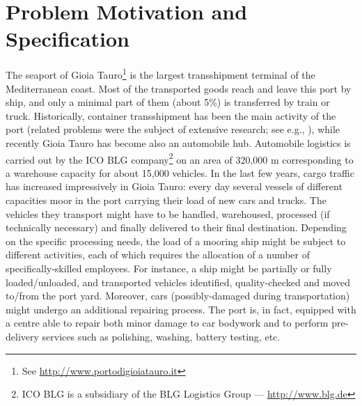 \documentclass{tlp}
\begin{document}
\section{Problem Motivation and Specification}\label{sec:domain}
The seaport of Gioia Tauro\footnote{See \url{http://www.portodigioiatauro.it}}
is the largest
transshipment terminal of the Mediterranean coast.
Most of the transported goods reach and leave this port by ship,
and only a minimal part of them (about 5\%) is transferred by train or truck.
Historically, container transshipment has been the main activity of the port
(related problems were the subject of extensive research; see e.g., ),
while  recently Gioia Tauro has become also an automobile hub.
Automobile logistics is carried out by the ICO BLG company\footnote{ICO BLG is a subsidiary of the BLG Logistics Group --- \url{http://www.blg.de}}
on an area of  320,000 m corresponding to a warehouse capacity for about 15,000 vehicles.
In the last few years, cargo traffic has increased impressively in Gioia Tauro:
every day several vessels of different capacities moor in the port carrying their load of new cars and trucks.
The vehicles they transport might have to be handled, warehoused, processed
(if technically necessary) and finally delivered to their final destination.
Depending on the specific processing needs, the load of a mooring ship might be subject
to different activities,  each of which requires the allocation of a number of specifically-skilled employees.
For instance, a ship might be partially or fully loaded/unloaded,
and transported vehicles identified, quality-checked and moved to/from the port yard.
Moreover, cars (possibly-damaged during transportation) might undergo an additional repairing
process. The port is, in fact, equipped with a centre able
to repair both minor damage to car bodywork and to perform
pre-delivery services such as polishing, washing, battery testing, etc.
\end{document}
